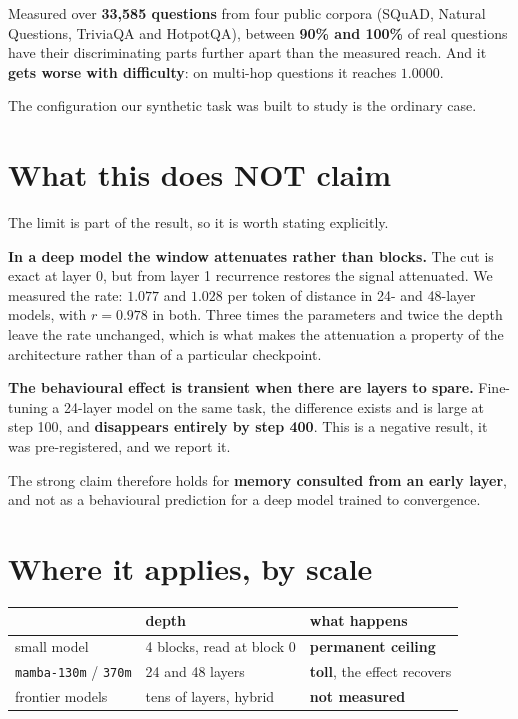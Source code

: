 \documentclass[11pt,a4paper]{article}
\begin{document}
Measured over \textbf{33{,}585 questions} from four public corpora (SQuAD, Natural Questions, TriviaQA
and HotpotQA), between \textbf{90\% and 100\%} of real questions have their discriminating parts
further apart than the measured reach. And it \textbf{gets worse with difficulty}: on multi-hop
questions it reaches $1.0000$.

The configuration our synthetic task was built to study is the ordinary case.

\section{What this does NOT claim}

The limit is part of the result, so it is worth stating explicitly.

\textbf{In a deep model the window attenuates rather than blocks.} The cut is exact at layer 0, but
from layer 1 recurrence restores the signal attenuated. We measured the rate: $1.077$ and $1.028$ per
token of distance in 24- and 48-layer models, with $r = 0.978$ in both. Three times the parameters and
twice the depth leave the rate unchanged, which is what makes the attenuation a property of the
architecture rather than of a particular checkpoint.

\textbf{The behavioural effect is transient when there are layers to spare.} Fine-tuning a 24-layer
model on the same task, the difference exists and is large at step 100, and \textbf{disappears
entirely by step 400}. This is a negative result, it was pre-registered, and we report it.

\begin{center}
\end{center}

The strong claim therefore holds for \textbf{memory consulted from an early layer}, and not as a
behavioural prediction for a deep model trained to convergence.

\section{Where it applies, by scale}

\begin{center}
\begin{tabular}{lll}
\toprule
 & depth & what happens \\
\midrule
small model & 4 blocks, read at block 0 & \textbf{permanent ceiling} \\
\texttt{mamba-130m} / \texttt{370m} & 24 and 48 layers & \textbf{toll}, the effect recovers \\
frontier models & tens of layers, hybrid & \textbf{not measured} \\
\bottomrule
\end{tabular}
\end{center}
\end{document}
